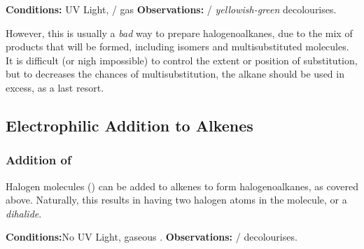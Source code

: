 			\vspace{1.5em}

			\vbox{\textbf{Conditions:} \tabto{35mm}UV Light,  /  gas}	%
			\vbox{\textbf{Observations:} \tabto{35mm}  / \textit{\color{YellowGreen}yellowish-green}  decolourises.}


			However, this is usually a \textit{bad} way to prepare halogenoalkanes, due to the mix of products that will be formed, including
			isomers and multisubstituted molecules. It is difficult (or nigh impossible) to control the extent or position of substitution,
			but to decreases the chances of multisubstitution, the alkane should be used in excess, as a last resort.



		\pagebreak
		\subsection{Electrophilic Addition to Alkenes}

			\subsubsection{Addition of }

				Halogen molecules () can be added to alkenes to form halogenoalkanes, as covered above. Naturally, this results in
				having two halogen atoms in the molecule, or a \textit{dihalide}.

				\vspace{1.5em}
				\vbox{\textbf{Conditions:}\tabto{35mm}No UV Light, gaseous .}	%
				\vbox{\textbf{Observations:}\tabto{35mm}  /   decolourises.}


